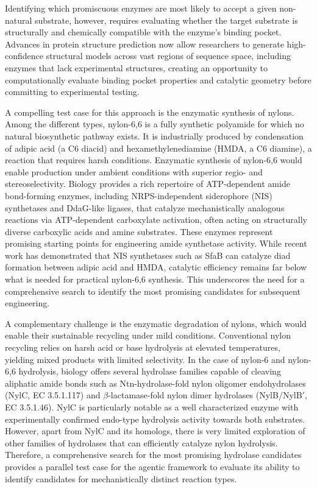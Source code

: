 \documentclass[12pt]{article}
\begin{document}
Identifying which promiscuous enzymes are most likely to accept a given non-natural substrate, however, requires evaluating whether the target substrate is structurally and chemically compatible with the enzyme's binding pocket. Advances in protein structure prediction\cite{jumper2021highly, abramson2024alphafold3, passaro2025boltz} now allow researchers to generate high-confidence structural models across vast regions of sequence space, including enzymes that lack experimental structures, creating an opportunity to computationally evaluate binding pocket properties and catalytic geometry before committing to experimental testing.

A compelling test case for this approach is the enzymatic synthesis of nylons. Among the different types, nylon-6,6 is a fully synthetic polyamide for which no natural biosynthetic pathway exists. It is industrially produced by condensation of adipic acid (a C6 diacid) and hexamethylenediamine (HMDA, a C6 diamine), a reaction that requires harsh conditions\cite{carothers1929studies}. Enzymatic synthesis of nylon-6,6 would enable production under ambient conditions with superior regio- and stereoselectivity. Biology provides a rich repertoire of ATP-dependent amide bond-forming enzymes, including NRPS-independent siderophore (NIS) synthetases\cite{oves2007enzymatic, nusca2012functional} and DdaG-like ligases\cite{hollenhorst2009atp}, that catalyze mechanistically analogous reactions via ATP-dependent carboxylate activation, often acting on structurally diverse carboxylic acids and amine substrates. These enzymes represent promising starting points for engineering amide synthetase activity. While recent work has demonstrated that NIS synthetases such as SfaB can catalyze diad formation between adipic acid and HMDA\cite{qian2025nylon}, catalytic efficiency remains far below what is needed for practical nylon-6,6 synthesis. This underscores the need for a comprehensive search to identify the most promising candidates for subsequent engineering.

A complementary challenge is the enzymatic degradation of nylons, which would enable their sustainable recycling under mild conditions. Conventional nylon recycling relies on harsh acid or base hydrolysis at elevated temperatures, yielding mixed products with limited selectivity\cite{patil2014nylon}. In the case of nylon-6 and nylon-6,6 hydrolysis, biology offers several hydrolase families capable of cleaving aliphatic amide bonds such as Ntn-hydrolase-fold nylon oligomer endohydrolases (NylC, EC 3.5.1.117)\cite{negoro2012nylon} and \(\beta\)-lactamase-fold nylon dimer hydrolases (NylB/NylB\('\), EC 3.5.1.46)\cite{negoro2005three}. NylC is particularly notable as a well characterized enzyme with experimentally confirmed endo-type hydrolysis activity towards both substrates. However, apart from NylC and its homologs\cite{drufva2025identification}, there is very limited exploration of other families of hydrolases that can efficiently catalyze nylon hydrolysis. Therefore, a comprehensive search for the most promising hydrolase candidates provides a parallel test case for the agentic framework to evaluate its ability to identify candidates for mechanistically distinct reaction types.
\end{document}
